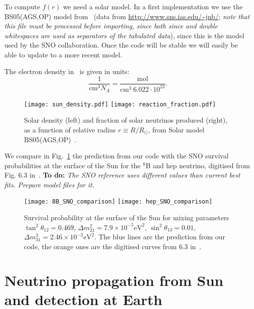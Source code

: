 \documentclass[11pt,a4paper]{article}
\newcommand{\todo}[1]{\textbf{To do:} \emph{\color{blue} #1}}
\newcommand{\cm}[0]{\text{cm}}
\begin{document}
To compute $f(r)$ we need a solar model. In a first implementation we use the BS05(AGS,OP) model from~\cite{Bahcall:2004pz} (data from \url{http://www.sns.ias.edu/~jnb/}; \emph{note that this file must be processed before importing, since both since and double whitespaces are used as separators of the tabulated data}), since this is the model used by the SNO collaboration. Once the code will be stable we will easily be able to update to a more recent model.

The electron density in~\cite{Bahcall:2004pz} is given in units:
\begin{equation}
	\frac{1}{\cm^3 N_A} = \frac{\text{mol}}{\cm^3\ 6.022 \cdot 10^{23} }.
\end{equation}
	
\begin{figure}[ht]
\texttt{[image: sun\_density.pdf]}
\texttt{[image: reaction\_fraction.pdf]}
\caption{Solar density (left) and fraction of solar neutrinos produced (right), as a function of relative radius $r \equiv R/R_\odot$, from Solar model BS05(AGS,OP)~\cite{Bahcall:2004pz}.}
\end{figure}

We compare in Fig.~\ref{fig:SNO_8B_hep_comparison} the prediction from our code with the SNO survival probabilities at the surface of the Sun for the ${}^8$B and hep neutrino, digitised from Fig. 6.3 in~\cite{FiuzadeBarros:2011qna}. \todo{The SNO reference uses different values than current best fits. Prepare model files for it.}

\begin{figure}[ht]
	\texttt{[image: 8B\_SNO\_comparison]}
	\texttt{[image: hep\_SNO\_comparison]}
	\caption{Survival probability at the surface of the Sun for mixing parameters $\tan^2\theta_{12} = 0.469$, $\Delta m_{21}^2 = 7.9 \times 10^{-5} \text{eV}^2$, $\sin^2 \theta_{13} = 0.01$, $\Delta m_{31}^2 = 2.46 \times 10^{-3} \text{eV}^2$. The blue lines are the prediction from our code, the orange ones are the digitised curves from 6.3 in~\cite{FiuzadeBarros:2011qna}.}
	\label{fig:SNO_8B_hep_comparison}
\end{figure}

\section{Neutrino propagation from Sun and detection at Earth}
\end{document}
